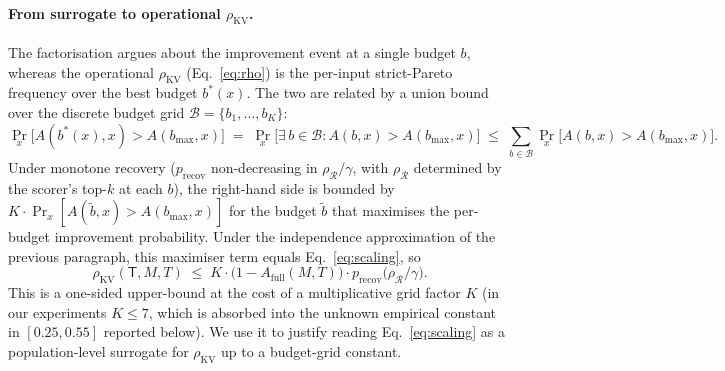 \documentclass{article} %
\begin{document}
\paragraph{From surrogate to operational $\rho_{\mathrm{KV}}$.} The
factorisation argues about the improvement event at a single budget $b$,
whereas the operational $\rho_{\mathrm{KV}}$ (Eq.~\eqref{eq:rho}) is the
per-input strict-Pareto frequency over the best budget $b^{*}(x)$. The
two are related by a union bound over the discrete budget grid $\mathcal{B}
= \{b_1, \dots, b_K\}$:
\[
\Pr_x\bigl[A(b^{*}(x), x) > A(b_{\max}, x)\bigr]
\;=\; \Pr_x\bigl[\exists\, b \in \mathcal{B} : A(b, x) > A(b_{\max}, x)\bigr]
\;\le\; \sum_{b \in \mathcal{B}} \Pr_x\bigl[A(b, x) > A(b_{\max}, x)\bigr].
\]
Under monotone recovery ($p_{\mathrm{recov}}$ non-decreasing in
$\rho_{\mathcal{R}}/\gamma$, with $\rho_{\mathcal{R}}$ determined by the
scorer's top-$k$ at each $b$), the right-hand side is bounded by
$K \cdot \Pr_x[A(\widetilde b, x) > A(b_{\max}, x)]$ for the budget
$\widetilde b$ that maximises the per-budget improvement probability.
Under the independence approximation of the previous paragraph, this
maximiser term equals Eq.~\eqref{eq:scaling}, so
\[
\rho_{\mathrm{KV}}(\mathsf{T}, M, T)
\;\le\; K \cdot \bigl(1 - A_{\mathrm{full}}(M, T)\bigr)
\cdot p_{\mathrm{recov}}\bigl(\rho_{\mathcal{R}} / \gamma\bigr).
\]
This is a one-sided upper-bound at the cost of a multiplicative grid
factor $K$ (in our experiments $K \le 7$, which is absorbed into the
unknown empirical constant in $[0.25, 0.55]$ reported below). We use it
to justify reading Eq.~\eqref{eq:scaling} as a population-level surrogate
for $\rho_{\mathrm{KV}}$ up to a budget-grid constant.
\end{document}
